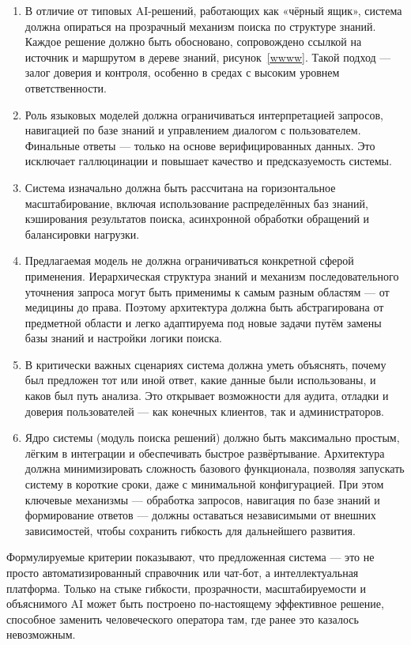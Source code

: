 \begin{enumerate}[label=\arabic*.]
    \item В отличие от типовых AI-решений, работающих как «чёрный ящик», система должна опираться на прозрачный механизм поиска по структуре знаний. Каждое решение должно быть обосновано, сопровождено ссылкой на источник и маршрутом в дереве знаний, рисунок~\ref{wwww}. Такой подход — залог доверия и контроля, особенно в средах с высоким уровнем ответственности.
    \item Роль языковых моделей должна ограничиваться интерпретацией запросов, навигацией по базе знаний и управлением диалогом с пользователем. Финальные ответы — только на основе верифицированных данных. Это исключает галлюцинации и повышает качество и предсказуемость системы.
    \item Система изначально должна быть рассчитана на горизонтальное масштабирование, включая использование распределённых баз знаний, кэширования результатов поиска, асинхронной обработки обращений и балансировки нагрузки.
    \item Предлагаемая модель не должна ограничиваться конкретной сферой применения. Иерархическая структура знаний и механизм последовательного уточнения запроса могут быть применимы к самым разным областям — от медицины до права. Поэтому архитектура должна быть абстрагирована от предметной области и легко адаптируема под новые задачи путём замены базы знаний и настройки логики поиска.
    \item В критически важных сценариях система должна уметь объяснять, почему был предложен тот или иной ответ, какие данные были использованы, и каков был путь анализа. Это открывает возможности для аудита, отладки и доверия пользователей — как конечных клиентов, так и администраторов.
    \item Ядро системы (модуль поиска решений) должно быть максимально простым, лёгким в интеграции и обеспечивать быстрое развёртывание. Архитектура должна минимизировать сложность базового функционала, позволяя запускать систему в короткие сроки, даже с минимальной конфигурацией. При этом ключевые механизмы — обработка запросов, навигация по базе знаний и формирование ответов — должны оставаться независимыми от внешних зависимостей, чтобы сохранить гибкость для дальнейшего развития.
\end{enumerate}

Формулируемые критерии показывают, что предложенная система — это не просто автоматизированный справочник или чат-бот, а интеллектуальная платформа. Только на стыке гибкости, прозрачности, масштабируемости и объяснимого AI может быть построено по-настоящему эффективное решение, способное заменить человеческого оператора там, где ранее это казалось невозможным.

